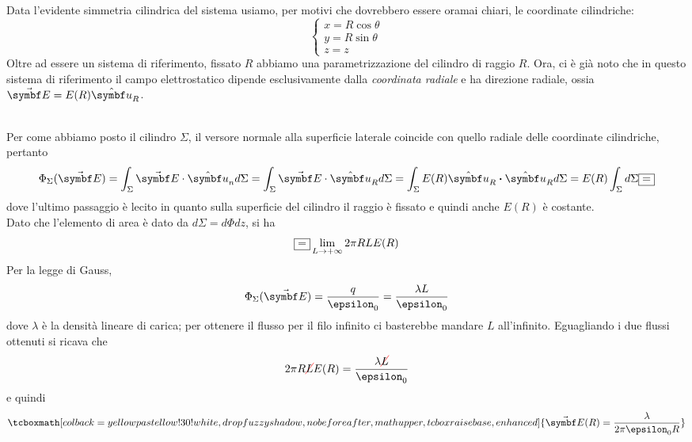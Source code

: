 	\begin{minipage}{0.7\textwidth}
		Data l'evidente simmetria cilindrica del sistema usiamo, per motivi che dovrebbero essere oramai chiari, le coordinate cilindriche:
		\begin{equation*}
			\begin{cases}
				x=R\cos\theta\\
				y=R\sin\theta\\
				z=z
			\end{cases}
		\end{equation*}
		Oltre ad essere un sistema di riferimento, fissato $R$ abbiamo una parametrizzazione del cilindro di raggio $R$. Ora, ci è già noto che in questo sistema di riferimento il campo elettrostatico dipende esclusivamente dalla \textit{coordinata radiale} e ha direzione radiale, ossia $\vba{E}=E(R)\vbh{u}_R$.
	\end{minipage}\\
Per come abbiamo posto il cilindro $\Sigma$, il versore normale alla superficie laterale coincide con quello radiale delle coordinate cilindriche, pertanto
\begin{equation*}
	\Phi_{\Sigma}(\vba{E})=\int_{\Sigma}\vba{E}\cdot\vbh{u}_nd\Sigma=\int_{\Sigma}\vba{E}\cdot\vbh{u}_Rd\Sigma=\int_{\Sigma} E(R)\vbh{u}_R\vdot\vbh{u}_Rd\Sigma=E(R)\int_{\Sigma} d\Sigma\squarequal
\end{equation*}
dove l'ultimo passaggio è lecito in quanto sulla superficie del cilindro il raggio è fissato e quindi anche $E(R)$ è costante.\\
Dato che l'elemento di area è dato da $d\Sigma=d\Phi dz$, si ha
\begin{equation*}
	\squarequal\lim_{L\to+\infty}2\pi R L E(R)
\end{equation*}
Per la legge di Gauss,
\begin{equation*}
	\Phi_{\Sigma}(\vba{E})=\frac{q}{\epsilon_0}=\frac{\lambda L}{\epsilon_0}
\end{equation*}
dove $\lambda$ è la densità lineare di carica; per ottenere il flusso per il filo infinito ci basterebbe mandare $L$ all'infinito. Eguagliando i due flussi ottenuti si ricava che
\begin{equation*}
	2\pi R\Ccancel[red]{L}E(R)=\frac{\lambda \Ccancel[red]{L}}{\epsilon_0}
\end{equation*}
e quindi
\begin{equation}
	\tcboxmath[colback=yellowpastellow!30!white,drop fuzzy shadow, nobeforeafter, math upper, tcbox raise base, enhanced]{\vba{E}(R)=\frac{\lambda}{2\pi\epsilon_0 R}}
\end{equation}
